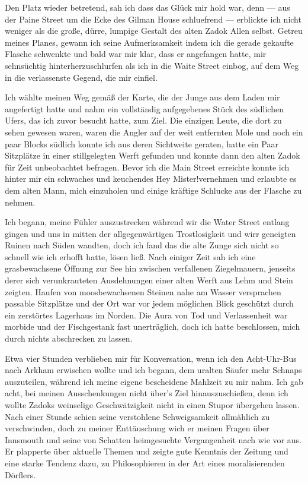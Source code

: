 Den Platz wieder betretend, sah ich dass das Glück mir hold war, denn --- aus der Paine Street um die Ecke des Gilman House schluefrend --- erblickte ich nicht weniger als die große, dürre, lumpige Gestalt des alten Zadok Allen selbst. Getreu meines Planes, gewann ich seine Aufmerksamkeit indem ich die gerade gekaufte Flasche schwenkte und bald war mir  klar, dass er angefangen hatte, mir sehnsüchtig hinterherzuschlurfen als ich in die Waite Street einbog, auf dem Weg in die verlassenste Gegend, die mir einfiel.

Ich wählte meinen Weg gemäß der Karte, die der Junge aus dem Laden mir angefertigt hatte und nahm ein vollständig aufgegebenes Stück des südlichen Ufers, das ich zuvor besucht hatte, zum Ziel. Die einzigen Leute, die dort zu sehen gewesen waren, waren die Angler auf der weit entfernten Mole und noch ein paar Blocks südlich konnte ich aus deren Sichtweite geraten, hatte ein Paar Sitzplätze in einer stillgelegten Werft gefunden und konnte dann den alten Zadok für Zeit unbeobachtet befragen. Bevor ich die Main Street erreichte konnte ich hinter mir ein schwaches und keuchendes \glqq Hey Mister!\grqq vernehmen und erlaubte es dem alten Mann, mich einzuholen und einige kräftige Schlucke aus der Flasche zu nehmen.

Ich begann, meine Fühler auszustrecken während wir die Water Street entlang gingen und uns in mitten der allgegenwärtigen Trostlosigkeit und wirr geneigten Ruinen nach Süden wandten, doch ich fand das die alte Zunge sich nicht so schnell wie ich erhofft hatte, lösen ließ. Nach einiger Zeit sah ich eine grasbewachsene Öffnung zur See hin zwischen verfallenen Ziegelmauern, jenseits derer sich verunkrauteten Ausdehnungen einer alten Werft aus Lehm und Stein zeigten. Haufen von moosbewachsenen Steinen nahe am Wasser versprachen passable Sitzplätze und der Ort war vor jedem möglichen Blick geschützt durch ein zerstörtes Lagerhaus im Norden. Die Aura von Tod und Verlassenheit war morbide und der Fischgestank fast unerträglich, doch ich hatte beschlossen, mich durch nichts abschrecken zu lassen.

Etwa vier Stunden verblieben mir für Konversation, wenn ich den Acht-Uhr-Bus nach Arkham erwischen wollte und ich begann, dem uralten Säufer mehr Schnaps auszuteilen, während ich meine eigene bescheidene Mahlzeit zu mir nahm. Ich gab acht, bei meinen Ausschenkungen nicht über's Ziel hinauszuschießen, denn ich wollte Zadoks weinselige Geschwätzigkeit nicht in einen Stupor übergehen lassen. Nach einer Stunde schien seine verstohlene Schweigsamkeit allmählich zu verschwinden, doch zu meiner Enttäuschung wich er meinen Fragen über Innsmouth und seine von Schatten heimgesuchte Vergangenheit nach wie vor aus. Er plapperte über aktuelle Themen und zeigte gute Kenntnis der Zeitung und eine starke Tendenz dazu, zu Philosophieren in der Art eines moralisierenden Dörflers.

